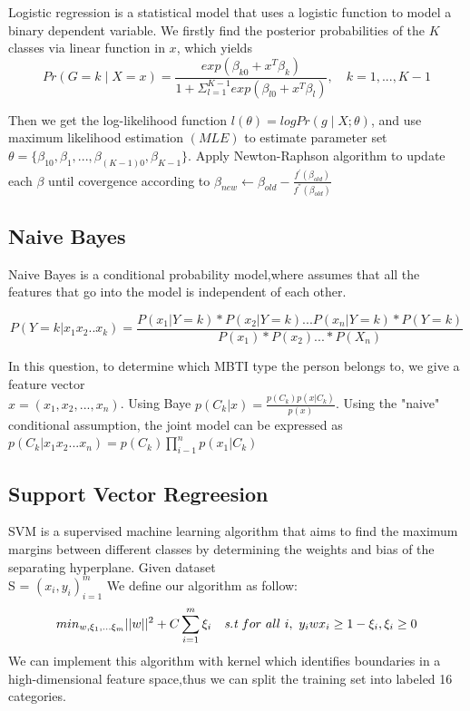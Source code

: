 \documentclass{article}
\begin{document}
Logistic regression is a statistical model that uses a logistic function to model a binary dependent variable. We firstly find the posterior probabilities of the $K$ classes via linear function in $x$, which yields $$Pr\left(G = k\mid X = x\right) = \frac{exp\left(\beta_{k0}+x^{T} \beta_{k}\right)}{1+\Sigma_{l=1}^{K-1}exp\left(\beta_{l0}+x^{T} \beta_{l}\right)},\quad k = 1,...,K-1$$ 

Then we get the log-likelihood function $l(\theta) = logPr\left(g\mid X; \theta\right) $, and use maximum likelihood estimation $\left(MLE\right)$ to estimate parameter set $\theta = \{\beta_{10},\beta_1,...,\beta_{\left(K-1\right)0},\beta_{K-1} \}$. Apply Newton-Raphson algorithm to update each $\beta$ until covergence according to $\beta_{new} \leftarrow \beta_{old} - \frac{f^{'}\left(\beta_{old}\right)}{f^{''}\left(\beta_{old}\right)}$


\subsection{Naive Bayes}
Naive Bayes is a conditional probability model,where  assumes that all the features that go into the model is independent of each other.

$$ P(Y= k|x_1x_2..x_k)= \frac{P(x_1|Y=k)*P(x_2|Y=k)...P(x_n|Y=k)*P(Y = k) }{ P(x_1)*P(x_2)...* P(X_n)}$$

In this question, to determine which MBTI type the person belongs to, we give a feature vector\\ $x = (x_1,x_2,...,x_n)$. Using Baye $ p(C_k|x) = \frac{p(C_k)p(x|C_k)}{p(x)} $. Using the "naive" conditional assumption, the joint model can be expressed as $p(C_k|x_1x_2...x_n) = p(C_k)\prod_{i-1}^n p(x_1|C_k)$ 

\subsection{Support Vector Regreesion}

SVM is a supervised machine learning algorithm that aims to find the maximum margins between different classes by determining the weights and bias of the separating hyperplane. Given dataset \\S = ${(x_i,y_i)}_{i=1}^m $ We define our algorithm as follow:
$$ min_{w,\xi_1,...\xi_m}||w||^2 + C\sum_{i=1}^m \xi_i \quad \emph{s.t} \ for \ all \ i, \ y_i w x_i \ge 1 - \xi_i, \xi_i \ge 0 $$
We can implement this algorithm with kernel which identifies boundaries in a high-dimensional feature space,thus  we can split the training set into labeled 16 categories.
\end{document}
